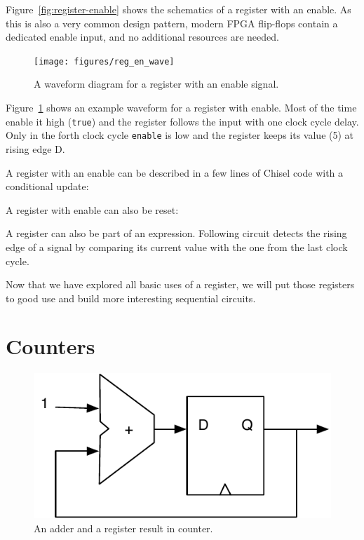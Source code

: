 \documentclass[%
    10pt,
    headinclude, footexclude,
    openright, %
    notitlepage,
    cleardoubleempty,
    headsepline,
    pointlessnumbers,
    bibtotoc, idxtotoc,
    ]{scrbook}
\newcommand{\code}[1]{{\small{\texttt{#1}}}}
\newcommand{\scale}{0.7}
\begin{document}
Figure~\ref{fig:register-enable} shows the schematics of a register with an enable.
As this is also a very common design pattern, modern FPGA flip-flops contain a
dedicated enable input, and no additional resources are needed.

\begin{figure}
  \centering
  \texttt{[image: figures/reg\_en\_wave]}
  \caption{A waveform diagram for a register with an enable signal.}
  \label{fig:register-en-wave}
\end{figure}

Figure~\ref{fig:register-en-wave} shows an example waveform for a register
with enable. Most of the time enable it high (\code{true}) and the register
follows the input with one clock cycle delay. Only in the forth clock cycle
\code{enable} is low and the register keeps its value (5) at rising edge D.

A register with an enable can be described in a few lines of Chisel code
with a conditional update:


\noindent A register with enable can also be reset:


A register can also be part of an expression. Following circuit detects the rising edge
of a signal by comparing its current value with the one from the last clock cycle.


Now that we have explored all basic uses of a register, we will put those registers to
good use and build more interesting sequential circuits.

\section{Counters}
\label{sec:counter}

\begin{figure}
  \centering
  \includegraphics[scale=\scale]{figures/counter}
  \caption{An adder and a register result in counter.}
  \label{fig:counter}
\end{figure}
\end{document}

